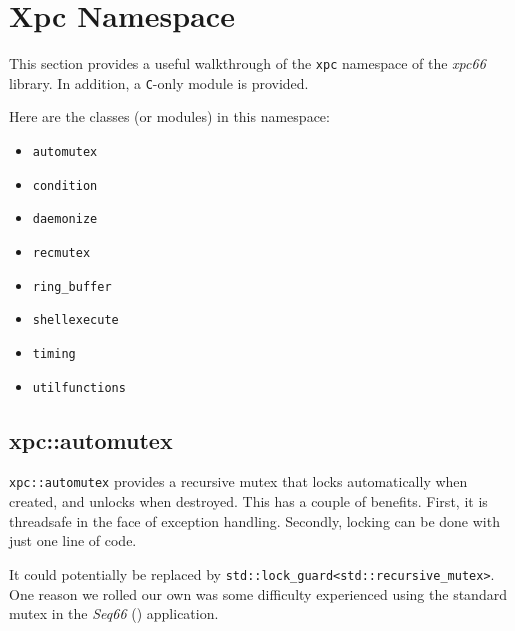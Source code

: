 %
%
%

\section{Xpc Namespace}
\label{sec:xpc_namespace}

   This section provides a useful walkthrough of the \texttt{xpc} namespace of
   the \textsl{xpc66} library.
   In addition, a \texttt{C}-only module is provided.

   Here are the classes (or modules) in this namespace:

   \begin{itemize}
      \item \texttt{automutex}
      \item \texttt{condition}
      \item \texttt{daemonize}
      \item \texttt{recmutex}
      \item \texttt{ring\_buffer}
      \item \texttt{shellexecute}
      \item \texttt{timing}
      \item \texttt{utilfunctions}
   \end{itemize}

\subsection{xpc::automutex}
\label{subsec:xpc_namespace_automutex}

   \texttt{xpc::automutex} provides a recursive
   mutex that locks automatically when
   created, and unlocks when destroyed.  This has a couple of benefits.
   First, it is threadsafe in the face of exception handling.
   Secondly, locking can be done with just one line of code.

   It could potentially be replaced by
   \texttt{std::lock\_guard<std::recursive\_mutex>}.
   One reason we rolled our own was some difficulty experienced using
   the standard mutex in the \textsl{Seq66} (\cite{seq66}) application.

